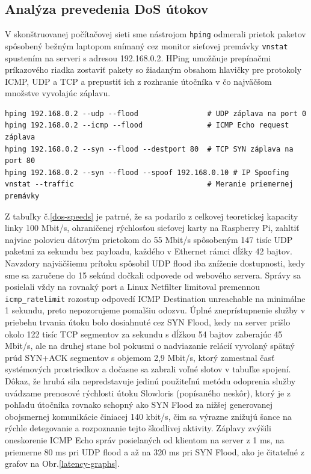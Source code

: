 \documentclass[12pt, a4paper]{article}
\begin{document}
\subsection{Analýza prevedenia DoS útokov}
V skonštruovanej počítačovej sieti sme nástrojom \verb|hping| odmerali prietok paketov spôsobený
bežným laptopom snímaný cez monitor sieťovej premávky \verb|vnstat| spustením na serveri s adresou 
192.168.0.2. HPing umožňuje prepínačmi príkazového riadka zostaviť pakety so žiadaným obsahom hlavičky pre 
protokoly  ICMP, UDP a TCP a prepustiť ich z rozhranie útočníka v čo najväčšom množstve vyvolajúc záplavu.
\begin{lstlisting}[caption=Príkazy na spustenie záplavových útokov a meranie]
hping 192.168.0.2 --udp --flood                # UDP záplava na port 0
hping 192.168.0.2 --icmp --flood               # ICMP Echo request záplava
hping 192.168.0.2 --syn --flood --destport 80  # TCP SYN záplava na port 80
hping 192.168.0.2 --syn --flood --spoof 192.168.0.10 # IP Spoofing
vnstat --traffic                               # Meranie priemernej premávky
\end{lstlisting}

Z tabuľky č.\ref{dos-speeds} je patrné, že sa podarilo z celkovej teoretickej kapacity linky 100 Mbit/s,
ohraničenej rýchlosťou sieťovej karty na Raspberry Pi, zahltiť najviac polovicu dátovým prietokom 
do 55 Mbit/s spôsobeným 147 tisíc UDP paketmi za sekundu bez payloadu, každého v Ethernet rámci dĺžky 42 
bajtov. Navzdory najväčšiemu prítoku spôsobil UDP flood iba zníženie dostupnosti, kedy sme sa zaručene do 15 
sekúnd dočkali odpovede od webového servera.
Správy sa posielali vždy na rovnaký port a Linux Netfilter limitoval premennou \verb|icmp_ratelimit|
rozostup odpovedí ICMP Destination unreachable na minimálne 1 sekundu, preto nepozorujeme
pomalšiu odozvu. Úplné zneprístupnenie služby v priebehu trvania útoku bolo dosiahnuté cez SYN Flood,
kedy na server prišlo okolo 122 tisíc TCP segmentov za sekundu s dĺžkou 54 bajtov zaberajúc
45 Mbit/s, ale na druhej stane bol pokusmi o nadviazanie relácií vyvolaný spätný prúd SYN+ACK segmentov s 
objemom 2,9 Mbit/s, ktorý zamestnal časť systémových prostriedkov a dočasne sa zabrali voľné slotov v tabuľke 
spojení. 
Dôkaz, že hrubá sila nepredstavuje jedinú použiteľnú metódu odoprenia služby uvádzame prenosové rýchlosti 
útoku Slowloris (popísaného neskôr), ktorý je z pohľadu útočníka rovnako schopný ako SYN Flood za nižšej 
generovanej obojsmernej komunikácie činiacej 140 kbit/s, čim sa výrazne znižujú šance na rýchle detegovanie a 
rozpoznanie tejto škodlivej aktivity. Záplavy zvýšili oneskorenie ICMP Echo správ posielaných od klientom na 
server z 1 ms, na priemerne 80 ms pri UDP flood a až na 320 ms pri SYN Flood, ako je čitateľné z grafov na 
Obr.\ref{latency-graphs}.
\end{document}
